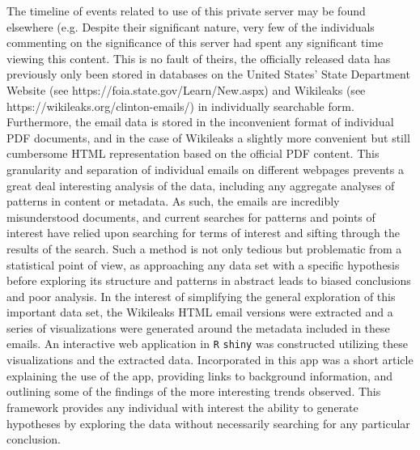 \documentclass[journal]{vgtc}                %
\begin{document}
The timeline of events related to use of this private server may be found elsewhere (e.g. 
Despite their significant nature, very few of the individuals commenting on the significance of this server had spent any significant time viewing this content. This is no fault of theirs, the officially released data has previously only been stored in databases on the United States' State Department Website (see https://foia.state.gov/Learn/New.aspx) and Wikileaks (see https://wikileaks.org/clinton-emails/) in individually searchable form. Furthermore, the email data is stored in the inconvenient format of individual PDF documents, and in the case of Wikileaks a slightly more convenient but still cumbersome HTML representation based on the official PDF content. This granularity and separation of individual emails on different webpages prevents a great deal interesting analysis of the data, including any aggregate analyses of patterns in content or metadata. As such, the emails are incredibly misunderstood documents, and current searches for patterns and points of interest have relied upon searching for terms of interest and sifting through the results of the search. Such a method is not only tedious but problematic from a statistical point of view, as approaching any data set with a specific hypothesis before exploring its structure and patterns in abstract leads to biased conclusions and poor analysis. In the interest of simplifying the general exploration of this important data set, the Wikileaks HTML email versions were extracted and a series of visualizations were generated around the metadata included in these emails. An interactive web application in \texttt{R} \texttt{shiny} was constructed utilizing these visualizations and the extracted data. Incorporated in this app was a short article explaining the use of the app, providing links to background information, and outlining some of the findings of the more interesting trends observed. This framework provides any individual with interest the ability to generate hypotheses by exploring the data without necessarily searching for any particular conclusion. 
\end{document}

